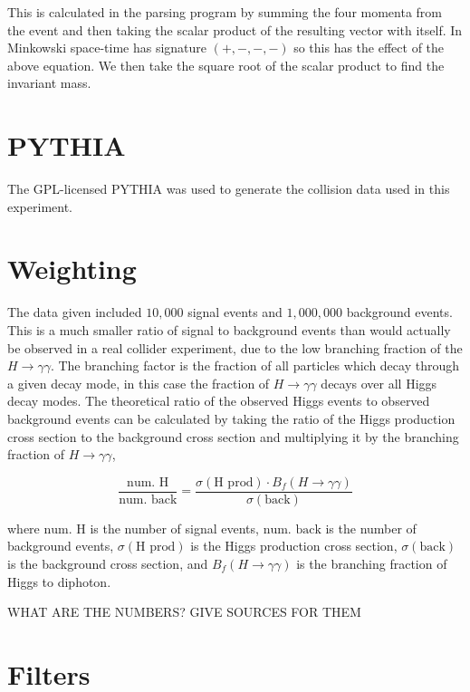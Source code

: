 \documentclass[11pt]{amsart}
\begin{document}
\begin{multicols}{2}
This is calculated in the parsing program by summing the four momenta from the event and then taking the scalar product of the resulting vector with itself. In Minkowski space-time has signature $(+, -, -, -)$ so this has the effect of the above equation. We then take the square root of the scalar product to find the invariant mass.

\section{PYTHIA}

The GPL-licensed PYTHIA was used to generate the collision data used in this experiment. \cite{pythia}

\section{Weighting}

The data given included $10,000$ signal events and $1,000,000$ background events. This is a much smaller ratio of signal to background events than would actually be observed in a real collider experiment, due to the low branching fraction of the $H \to \gamma\gamma$. The branching factor is the fraction of all particles which decay through a given decay mode, in this case the fraction of $H \to \gamma\gamma$ decays  over all Higgs decay modes. The theoretical ratio of the observed Higgs events to observed background events can be calculated by taking the ratio of the Higgs production cross section to the background cross section and multiplying it by the branching fraction of $H \to \gamma\gamma$,

\begin{equation}
  \label{eq:weighting}
  \frac{\text{num. H}}{\text{num. back}} = \frac{\sigma{\left(\text{H prod}\right)} \cdot B_f\left(H\to\gamma\gamma\right)}{\sigma{\left(\text{back}\right)}}
\end{equation}

where $\text{num. H}$ is the number of signal events, $\text{num. back}$ is the number of background events, $\sigma{\left(\text{H prod}\right)}$ is the Higgs production cross section, $\sigma{\left(\text{back}\right)}$ is the background cross section, and $B_f\left(H\to\gamma\gamma\right)$ is the branching fraction of Higgs to diphoton.


WHAT ARE THE NUMBERS? GIVE SOURCES FOR THEM


\section{Filters}


\end{multicols}
\end{document}
